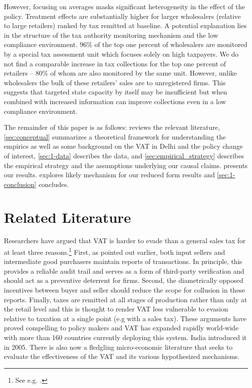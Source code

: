 However, focusing on averages masks significant heterogeneity in the effect of the policy. Treatment effects are substantially higher for larger wholesalers (relative to large retailers) ranked by tax remitted at baseline. A potential explanation lies in the structure of the tax authority monitoring mechanism and the low compliance environment. 96\% of the top one percent of wholesalers are monitored by a special tax assessment unit which focuses solely on high taxpayers. We do not find a comparable increase in tax collections for the top one percent of retailers -- 80\% of whom are also monitored by the same unit. However, unlike wholesalers the bulk of these retailers' sales are to unregistered firms. This suggests that targeted state capacity by itself may be insufficient but when combined with increased information can improve collections even in a low compliance environment.

The remainder of this paper is as follows:  reviews the relevant literature, \cref{sec:conceptual} summarizes  a theoretical framework for understanding the empirics as well as some background on the VAT in Delhi and the policy change of interest, \cref{sec:1-data} describes the data, and \cref{sec:empirical_strategy} describes the empirical strategy and the assumptions underlying our causal claims.  presents our results.  explores likely mechanism for our reduced form results and \cref{sec:1-conclusion} concludes.

\section{Related Literature} 
\label{sec:1-literature} 
Researchers have argued that VAT is harder to evade than a general sales tax for at least three reasons.\footnote{See e.g. \cite{agha1996designing}.} First, as pointed out earlier, both input sellers and intermediate good purchasers maintain reports of transactions. In principle, this provides a reliable audit trail and serves as a form of third-party verification and should act as a preventive deterrent for firms. Second, the diametrically opposed incentives between buyer and seller should reduce the scope for collusion in these reports. Finally, taxes are remitted at all stages of production rather than only at the retail level and this is thought to render VAT less vulnerable to evasion relative to taxation at a single point (e.g with a sales tax). These arguments have proved compelling to policy makers and VAT has expanded rapidly world-wide with more than 160 countries currently deploying this system. India introduced it in 2005. There is also now a fledgling micro-economic literature that seeks to evaluate the effectiveness of the VAT and its various hypothesized mechanisms.

